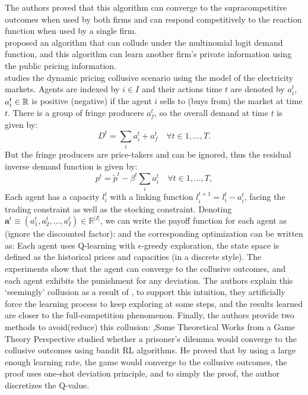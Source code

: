 \documentclass[10pt]{report}
\begin{document}
The authors proved that this algorithm can converge to the supracompetitive outcomes when used by both firms and can respond competitively to the reaction function when used by a single firm.\\ 
\cite{loots2023data} proposed an algorithm that can collude under the multinomial logit demand function, and this algorithm can learn another firm's private information using the public pricing information. \\
\cite{abada2023artificial} studies the dynamic pricing collusive scenario using the model of the electricity markets. Agents are indexed by $i\in I$ and their actions time $t$ are denoted by $a_i^t$, $a_i^t\in\RR$ is positive (negative) if the agent $i$ sells to (buys from) the market at time $t$. There is a group of fringe producers $a_f^t$, so the overall demand at time $t$ is given by:
\[
    D^t=\sum_ia_i^t+a_f^t\quad\forall t\in1,\ldots, T.
\]
But the fringe producers are price-takers and can be ignored, thus the residual inverse demand function is given by:
\[
    p^t=\tilde{p}^t-\beta^t\sum_ia_i^t\quad\forall t\in1,\ldots,T,
\]
Each agent has a capacity $l_i^t$ with a linking function $l_i^{t+1}=l_i^t-a_i^t$, facing the trading constraint as well as the stocking constraint. 
Denoting $\mathbf{a}^{t}\equiv(a_{1}^{t},a_{2}^{t},\ldots,a_{I}^{t})\in\mathbb{R}^{|I|}$, we can write the payoff function for each agent as (ignore the discounted factor):
and the corresponding optimization can be written as:
Each agent uses Q-learning with $\epsilon$-greedy exploration, the state space is defined as the historical prices and capacities (in a discrete style). 
The experiments show that the agent can converge to the collusive outcomes, and each agent exhibits the punishment for any deviation. 
The authors explain this `seemingly' collusion as a result of , to support this intuition, they artificially force the learning process to keep exploring at some steps, and the results learned are closer to the full-competition phenomenon. 
Finally, the authors provide two methods to avoid(reduce) this collusion:
\sep{Some Theoretical Works from a Game Theory Perspective}
\cite{dolgopolov2024reinforcement} studied whether a prisoner's dilemma would converge to the collusive outcomes using bandit RL algorithms. 
He proved that by using a large enough learning rate, the game would converge to the collusive outcomes, the proof uses one-shot deviation principle, and to simply the proof, the author discretizes the Q-value. 
\end{document}
